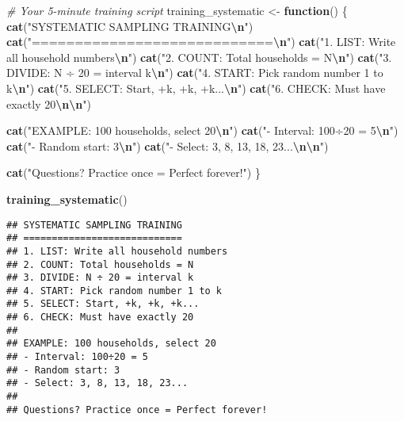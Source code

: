 \documentclass[
]{article}
\newenvironment{Shaded}{\begin{snugshade}}{\end{snugshade}}
\newcommand{\CommentTok}[1]{\textcolor[rgb]{0.56,0.35,0.01}{\textit{#1}}}
\newcommand{\ControlFlowTok}[1]{\textcolor[rgb]{0.13,0.29,0.53}{\textbf{#1}}}
\newcommand{\FunctionTok}[1]{\textcolor[rgb]{0.13,0.29,0.53}{\textbf{#1}}}
\newcommand{\NormalTok}[1]{#1}
\newcommand{\OtherTok}[1]{\textcolor[rgb]{0.56,0.35,0.01}{#1}}
\newcommand{\SpecialCharTok}[1]{\textcolor[rgb]{0.81,0.36,0.00}{\textbf{#1}}}
\newcommand{\StringTok}[1]{\textcolor[rgb]{0.31,0.60,0.02}{#1}}
\begin{document}
\begin{Shaded}
\begin{Highlighting}[]
\CommentTok{\# Your 5{-}minute training script}
\NormalTok{training\_systematic }\OtherTok{\textless{}{-}} \ControlFlowTok{function}\NormalTok{() \{}
  \FunctionTok{cat}\NormalTok{(}\StringTok{"SYSTEMATIC SAMPLING TRAINING}\SpecialCharTok{\textbackslash{}n}\StringTok{"}\NormalTok{)}
  \FunctionTok{cat}\NormalTok{(}\StringTok{"============================}\SpecialCharTok{\textbackslash{}n}\StringTok{"}\NormalTok{)}
  \FunctionTok{cat}\NormalTok{(}\StringTok{"1. LIST: Write all household numbers}\SpecialCharTok{\textbackslash{}n}\StringTok{"}\NormalTok{)}
  \FunctionTok{cat}\NormalTok{(}\StringTok{"2. COUNT: Total households = N}\SpecialCharTok{\textbackslash{}n}\StringTok{"}\NormalTok{)}
  \FunctionTok{cat}\NormalTok{(}\StringTok{"3. DIVIDE: N ÷ 20 = interval k}\SpecialCharTok{\textbackslash{}n}\StringTok{"}\NormalTok{)}
  \FunctionTok{cat}\NormalTok{(}\StringTok{"4. START: Pick random number 1 to k}\SpecialCharTok{\textbackslash{}n}\StringTok{"}\NormalTok{)}
  \FunctionTok{cat}\NormalTok{(}\StringTok{"5. SELECT: Start, +k, +k, +k...}\SpecialCharTok{\textbackslash{}n}\StringTok{"}\NormalTok{)}
  \FunctionTok{cat}\NormalTok{(}\StringTok{"6. CHECK: Must have exactly 20}\SpecialCharTok{\textbackslash{}n\textbackslash{}n}\StringTok{"}\NormalTok{)}
  
  \FunctionTok{cat}\NormalTok{(}\StringTok{"EXAMPLE: 100 households, select 20}\SpecialCharTok{\textbackslash{}n}\StringTok{"}\NormalTok{)}
  \FunctionTok{cat}\NormalTok{(}\StringTok{"{-} Interval: 100÷20 = 5}\SpecialCharTok{\textbackslash{}n}\StringTok{"}\NormalTok{)}
  \FunctionTok{cat}\NormalTok{(}\StringTok{"{-} Random start: 3}\SpecialCharTok{\textbackslash{}n}\StringTok{"}\NormalTok{)}
  \FunctionTok{cat}\NormalTok{(}\StringTok{"{-} Select: 3, 8, 13, 18, 23...}\SpecialCharTok{\textbackslash{}n\textbackslash{}n}\StringTok{"}\NormalTok{)}
  
  \FunctionTok{cat}\NormalTok{(}\StringTok{"Questions? Practice once = Perfect forever!"}\NormalTok{)}
\NormalTok{\}}

\FunctionTok{training\_systematic}\NormalTok{()}
\end{Highlighting}
\end{Shaded}

\begin{verbatim}
## SYSTEMATIC SAMPLING TRAINING
## ============================
## 1. LIST: Write all household numbers
## 2. COUNT: Total households = N
## 3. DIVIDE: N ÷ 20 = interval k
## 4. START: Pick random number 1 to k
## 5. SELECT: Start, +k, +k, +k...
## 6. CHECK: Must have exactly 20
## 
## EXAMPLE: 100 households, select 20
## - Interval: 100÷20 = 5
## - Random start: 3
## - Select: 3, 8, 13, 18, 23...
## 
## Questions? Practice once = Perfect forever!
\end{verbatim}
\end{document}
